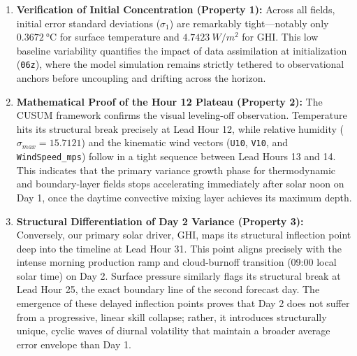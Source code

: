 \begin{enumerate}
    \item \textbf{Verification of Initial Concentration (Property 1):} Across all fields, initial error standard deviations ($\sigma_1$) are remarkably tight—notably only $\SI{0.3672}{\degreeCelsius}$ for surface temperature and $\SI{4.7423}{W/m^2}$ for GHI. This low baseline variability quantifies the impact of data assimilation at initialization (\texttt{06z}), where the model simulation remains strictly tethered to observational anchors before uncoupling and drifting across the horizon.
    \item \textbf{Mathematical Proof of the Hour 12 Plateau (Property 2):} The CUSUM framework confirms the visual leveling-off observation. Temperature hits its structural break precisely at Lead Hour 12, while relative humidity ($\sigma_{max} = \num{15.7121}$) and the kinematic wind vectors (\texttt{U10}, \texttt{V10}, and \texttt{WindSpeed\_mps}) follow in a tight sequence between Lead Hours 13 and 14. This indicates that the primary variance growth phase for thermodynamic and boundary-layer fields stops accelerating immediately after solar noon on Day 1, once the daytime convective mixing layer achieves its maximum depth.
    \item \textbf{Structural Differentiation of Day 2 Variance (Property 3):} Conversely, our primary solar driver, GHI, maps its structural inflection point deep into the timeline at Lead Hour 31. This point aligns precisely with the intense morning production ramp and cloud-burnoff transition (\num{09:00} local solar time) on Day 2. Surface pressure similarly flags its structural break at Lead Hour 25, the exact boundary line of the second forecast day. The emergence of these delayed inflection points proves that Day 2 does not suffer from a progressive, linear skill collapse; rather, it introduces structurally unique, cyclic waves of diurnal volatility that maintain a broader average error envelope than Day 1.
\end{enumerate}
